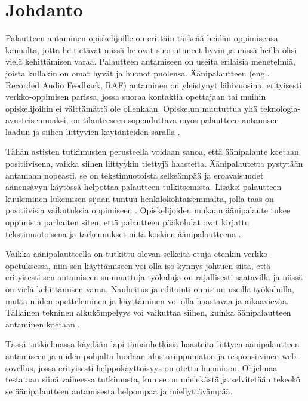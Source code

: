 \documentclass[utf8]{gradu3}
\begin{document}
\mainmatter

\chapter{Johdanto}

Palautteen antaminen opiskelijoille on erittäin tärkeää heidän oppimisensa kannalta, jotta he tietävät missä he ovat suoriutuneet hyvin ja missä heillä olisi vielä kehittämisen varaa. Palautteen antamiseen on useita erilaisia menetelmiä, joista kullakin on omat hyvät ja huonot puolensa. Äänipalautteen (engl. Recorded Audio Feedback, RAF) antaminen on yleistynyt lähivuosina, erityisesti verkko-oppimisen parissa, jossa suoraa kontaktia opettajaan tai muihin opiskelijoihin ei välttämättä ole ollenkaan. Opiskelun muututtua yhä teknologia-avusteisemmaksi, on tilanteeseen sopeuduttava myös palautteen antamisen laadun ja siihen liittyvien käytänteiden saralla \parencite[][]{versus}.

Tähän astisten tutkimusten perusteella voidaan sanoa, että äänipalaute koetaan positiivisena, vaikka siihen liittyykin tiettyjä haasteita. Äänipalautetta pystytään antamaan nopeasti, se on tekstimuotoista selkeämpää ja eroavaisuudet äänensävyn käytössä helpottaa palautteen tulkitsemista. Lisäksi palautteen kuuleminen lukemisen sijaan tuntuu henkilökohtaisemmalta, jolla taas on positiivisia vaikutuksia oppimiseen \parencite[][]{moderating}. Opiskelijoiden mukaan äänipalaute tukee oppimista parhaiten siten, että palautteen pääkohdat ovat kirjattu tekstimuotoisena ja tarkennukset niitä koskien äänipalautteena \parencite[][]{using}.

Vaikka äänipalautteella on tutkittu olevan selkeitä etuja etenkin verkko-opetuksessa, niin sen käyttämiseen voi olla iso kynnys johtuen siitä, että erityisesti sen antamiseen suunnattuja työkaluja on rajallisesti saatavilla ja niissä on vielä kehittämisen varaa. Nauhoitus ja editointi onnistuu useilla työkaluilla, mutta niiden opetteleminen ja käyttäminen voi olla haastavaa ja aikaavievää. Tällainen tekninen alkukömpelyys voi vaikuttaa siihen, kuinka äänipalautteen antaminen koetaan \parencite[][]{versus}.

Tässä tutkielmassa käydään läpi tämänhetkisiä haasteita liittyen äänipalautteen antamiseen ja niiden pohjalta luodaan alustariippumaton ja responsiivinen web-sovellus, jossa erityisesti helppokäyttöisyys on otettu huomioon. Ohjelmaa testataan siinä vaiheessa tutkimusta, kun se on mielekästä ja selvitetään tekeekö se äänipalautteen antamisesta helpompaa ja miellyttävämpää.
\end{document}
